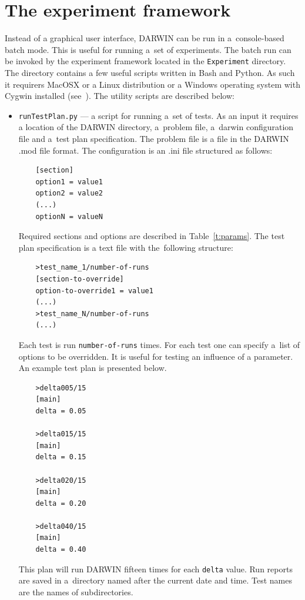 \section*{The experiment framework} 

Instead of a graphical user interface, DARWIN can be run in a~console-based
batch mode. This is useful for running a~set of experiments. The batch run can
be invoked by the experiment framework located in the \texttt{Experiment}
directory. The directory contains a few useful scripts written in Bash and
Python. As such it requirers MacOSX or a Linux distribution or a Windows
operating system with Cygwin installed (see~\cite{Laz00}). The utility scripts
are described below:

\begin{itemize}
\item \texttt{runTestPlan.py} --- a script for running a~set of tests. As an
  input it requires a location of the DARWIN directory, a~problem file,
  a~darwin configuration file and a~test plan specification. The problem file
  is a file in the DARWIN .mod file format. The configuration is an .ini file
  structured as follows:
  \begin{lstlisting}
    [section]
    option1 = value1
    option2 = value2
    (...)
    optionN = valueN
  \end{lstlisting}

  
  Required sections and options are described in Table~\ref{t:params}. The
  test plan specification is a text file with the~following structure:
  \begin{lstlisting}
    >test_name_1/number-of-runs
    [section-to-override]
    option-to-override1 = value1
    (...)
    >test_name_N/number-of-runs
    (...)
  \end{lstlisting}

  Each test is run \texttt{number-of-runs} times. For each test one can
  specify a~list of options to be overridden. It is useful for testing an
  influence of a parameter. An example test plan is presented below.
  \begin{lstlisting}
    >delta005/15
    [main]
    delta = 0.05

    >delta015/15
    [main]
    delta = 0.15

    >delta020/15
    [main]
    delta = 0.20

    >delta040/15
    [main]
    delta = 0.40
  \end{lstlisting}

  This plan will run DARWIN fifteen times for each \texttt{delta} value. Run
  reports are saved in a~directory named after the current date and time. Test
  names are the names of subdirectories.


\end{itemize}
